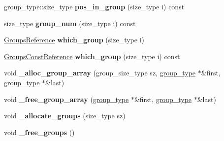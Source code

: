 \begin{DoxyCompactItemize}
\item 
group\+\_\+type\+::size\+\_\+type {\bfseries pos\+\_\+in\+\_\+group} (size\+\_\+type i) const \hypertarget{classspp___1_1sparsetable_ab14aa3c31cbee2e7024c9c102fad518d}{}\label{classspp___1_1sparsetable_ab14aa3c31cbee2e7024c9c102fad518d}

\item 
size\+\_\+type {\bfseries group\+\_\+num} (size\+\_\+type i) const \hypertarget{classspp___1_1sparsetable_a555a4650b989c43bc570458c3c96a9e7}{}\label{classspp___1_1sparsetable_a555a4650b989c43bc570458c3c96a9e7}

\item 
\hyperlink{classspp___1_1sparsegroup}{Groups\+Reference} {\bfseries which\+\_\+group} (size\+\_\+type i)\hypertarget{classspp___1_1sparsetable_a61dc57b270c14283381d0f235e5e1de1}{}\label{classspp___1_1sparsetable_a61dc57b270c14283381d0f235e5e1de1}

\item 
\hyperlink{classspp___1_1sparsegroup}{Groups\+Const\+Reference} {\bfseries which\+\_\+group} (size\+\_\+type i) const \hypertarget{classspp___1_1sparsetable_a3fac44e2b26310e1ba0fbcdefeae910e}{}\label{classspp___1_1sparsetable_a3fac44e2b26310e1ba0fbcdefeae910e}

\item 
void {\bfseries \+\_\+alloc\+\_\+group\+\_\+array} (group\+\_\+size\+\_\+type sz, \hyperlink{classspp___1_1sparsegroup}{group\+\_\+type} $\ast$\&first, \hyperlink{classspp___1_1sparsegroup}{group\+\_\+type} $\ast$\&last)\hypertarget{classspp___1_1sparsetable_a94444a074d814fd4a9c457279a38cd79}{}\label{classspp___1_1sparsetable_a94444a074d814fd4a9c457279a38cd79}

\item 
void {\bfseries \+\_\+free\+\_\+group\+\_\+array} (\hyperlink{classspp___1_1sparsegroup}{group\+\_\+type} $\ast$\&first, \hyperlink{classspp___1_1sparsegroup}{group\+\_\+type} $\ast$\&last)\hypertarget{classspp___1_1sparsetable_af80acf8bed113348b1dbb8c24f81b543}{}\label{classspp___1_1sparsetable_af80acf8bed113348b1dbb8c24f81b543}

\item 
void {\bfseries \+\_\+allocate\+\_\+groups} (size\+\_\+type sz)\hypertarget{classspp___1_1sparsetable_af4162c81c6262dbc46d2121cbea1e874}{}\label{classspp___1_1sparsetable_af4162c81c6262dbc46d2121cbea1e874}

\item 
void {\bfseries \+\_\+free\+\_\+groups} ()\hypertarget{classspp___1_1sparsetable_afbe9f939077166662f9548494c77454f}{}\label{classspp___1_1sparsetable_afbe9f939077166662f9548494c77454f}


\end{DoxyCompactItemize}
